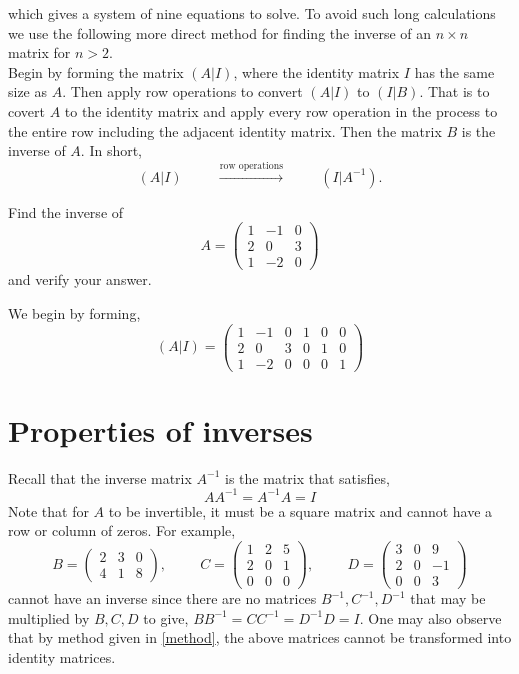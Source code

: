 \documentclass{ximera}
\begin{document}
which gives a system of nine equations to solve. To avoid such long calculations we use the following more direct method for finding the inverse of an $n\times n$ matrix for $n>2$. \\
Begin by forming the matrix $(A|I)$, where the identity matrix $I$ has the same size as $A$. Then apply row operations to convert $(A|I)$ to $(I|B)$. That is to covert $A$ to the identity matrix and apply every row operation in the process to the entire row including the adjacent identity matrix. Then the matrix $B$ is the inverse of $A$. In short,
\begin{equation}\label{method}
(A|I) \hspace{1cm}\xrightarrow{\text{row operations}}\hspace{1cm} (I|A^{-1}).
\end{equation}

 \begin{example}
Find the inverse of 
 \[A= \left(\begin{array}{ccc}
  1 &  -1 & 0 \\
  2 &  0 & 3 \\
  1 & -2 & 0
\end{array}\right)
\]
and verify your answer. 
\begin{prompt}
We begin by forming, 
\[
(A|I)= \left(\begin{array}{ccc|ccc}
  1 &  -1 & 0 & 1 &0 &0 \\
  2 &  0 & 3 & 0 &1 &0\\
  1 & -2 & 0 & 0 &0 &1
\end{array}\right)
\]
\end{prompt}
\end{example}
\section*{Properties of inverses} 
Recall that the inverse matrix $A^{-1}$ is the matrix that satisfies,
\begin{equation*}
AA^{-1}= A^{-1}A= I
\end{equation*}
Note that for $A$ to be invertible, it must be a square matrix and cannot have a row or column of zeros. For example,
 \[B= \left(\begin{array}{ccc}
  2 &  3 & 0 \\
  4 &  1 & 8 
\end{array}\right), \hspace{1cm} C= \left(\begin{array}{ccc}
  1 &  2 & 5 \\
  2 &  0 & 1 \\
  0 & 0& 0
\end{array}\right), \hspace{1cm} D = \left(\begin{array}{ccc}
  3 &  0 & 9 \\
  2 &  0 & -1 \\
  0 & 0& 3
\end{array}\right)
\]
cannot have an inverse since there are no matrices $B^{-1}, C^{-1}, D^{-1}$ that may be multiplied by $B,C,D$ to give, $BB^{-1}= CC^{-1}=D^{-1}D=I$. One may also observe that by method given in \eqref{method}, the above matrices cannot be transformed into identity matrices. 
\end{document}
